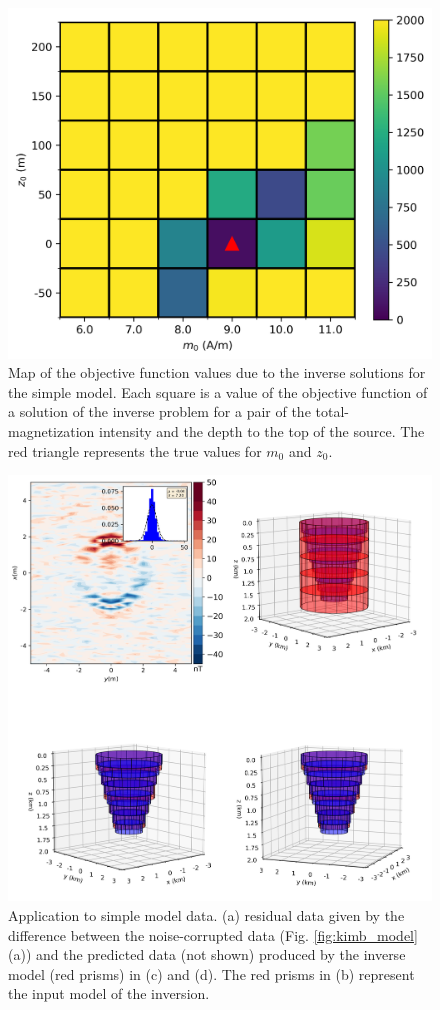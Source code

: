 \begin{figure}
	\centering
	\includegraphics[scale=.75]{figures/wedding_cake_obj_func_map.png}
	\caption{Map of the objective function values due to the inverse solutions for the simple model. Each square is a value of the objective function of a solution of the inverse problem for a pair of the total-magnetization intensity and the depth to the top of the source. The red triangle represents the true values for $m_0$ and $z_0$.
	}
	\label{fig:kimb_map}
\end{figure}

\begin{figure}
	\centering
	\includegraphics[scale=.5]{figures/wedding_cake_results.png}
	\caption{Application to simple model data. (a) residual data given by the difference between the noise-corrupted data (Fig. \ref{fig:kimb_model}(a)) and the predicted data (not shown) produced by the inverse model (red prisms) in (c) and (d). The red prisms in (b) represent the input model of the inversion.
	}
	\label{fig:kimb_results}
\end{figure}

